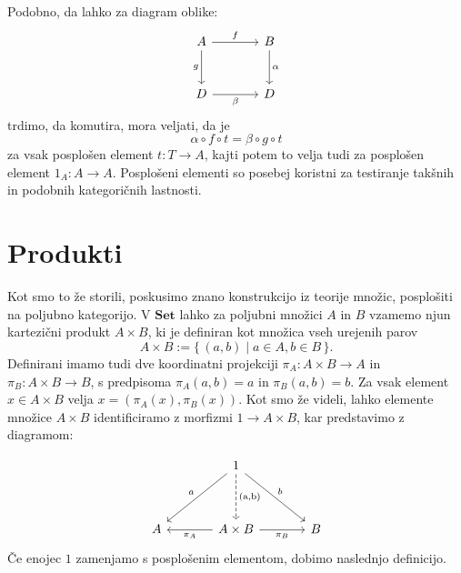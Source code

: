 \documentclass[12pt,a4paper]{book}
\theoremstyle{definition}
\theoremstyle{plain}
\theoremstyle{definition}
\theoremstyle{remark}
\newcommand{\cat}[1]{\textbf{#1}}
\renewcommand{\set}[1]{\{\,#1\,\}}
\begin{document}
Podobno, da lahko za diagram oblike:
$$\begin{tikzcd}[column sep=large, row sep=large]
A \ar[d, "g"'] \ar[r, "f"] & B \ar[d, "\alpha"] \\
D \ar[r, "\beta"'] & D
\end{tikzcd}$$
trdimo, da komutira, mora veljati, da je 
$$\alpha \circ f \circ  t = \beta \circ g \circ t$$
za vsak posplošen element $t : T \to A$, kajti potem to velja tudi za posplošen element $1_A : A \to A$. Posplošeni elementi so posebej koristni za testiranje takšnih in podobnih kategoričnih lastnosti.

\section{Produkti}
Kot smo to že storili, poskusimo znano konstrukcijo iz teorije množic, posplošiti na poljubno kategorijo. V $\cat{Set}$ lahko za poljubni množici $A$ in $B$ vzamemo njun kartezični produkt $A \times B$, ki je definiran kot množica vseh urejenih parov 
$$A \times B := \set{(a,b) \mid a \in A, b \in B}.$$
Definirani imamo tudi dve koordinatni projekciji $\pi_A : A\times B \to A$ in $\pi_B : A \times B \to B$, s predpisoma $\pi_A(a,b) = a$ in $\pi_B(a,b) = b$. Za vsak element $x \in A \times B$ velja $x = (\pi_A(x), \pi_B(x))$. Kot smo že videli, lahko elemente množice $A \times B$ identificiramo z morfizmi $1 \to A \times B$, kar predstavimo z diagramom:

$$ \begin{tikzcd}[row sep=huge, column sep=large]
&  1 \ar[dl, "a"'] \ar[d, dashed, "\text{(a,b)}", font=\large] \ar[dr, "b"] & \\
A & \ar[l, "\pi_A"] A \times B \ar[r, "\pi_B"'] & B
\end{tikzcd} $$
%
Če enojec $1$ zamenjamo s posplošenim elementom, dobimo naslednjo definicijo.
\end{document}
